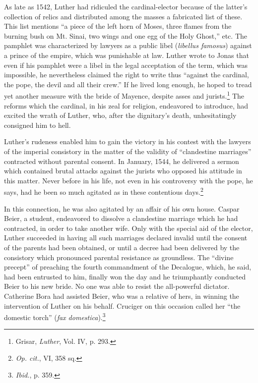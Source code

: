 As late as 1542, Luther had ridiculed the cardinal-elector because
of the latter’s collection of relics and distributed among the masses a
fabricated list of these. This list mentions “a piece of the left horn
of Moses, three flames from the burning bush on Mt. Sinai, two wings
and one egg of the Holy Ghost,” etc. The pamphlet was characterized
by lawyers as a public libel (\textit{libellus famosus}) against a prince of the
empire, which was punishable at law. Luther wrote to Jonas that
even if his pamphlet were a libel in the legal acceptation of the term,
which was impossible, he nevertheless claimed the right to write thus
“against the cardinal, the pope, the devil and all their crew.” If he
lived long enough, he hoped to tread yet another measure with the
bride of Mayence, despite asses and jurists.\footnote{Grisar, \textit{Luther}, Vol. IV, p. 293.}
The reforms which the
cardinal, in his zeal for religion, endeavored to introduce, had excited
the wrath of Luther, who, after the dignitary’s death, unhesitatingly
consigned him to hell.

Luther’s rudeness enabled him to gain the victory in his contest
with the lawyers of the imperial consistory in the matter of the
validity of “clandestine marriages” contracted without parental consent.
In January, 1544, he delivered a sermon which contained brutal
attacks against the jurists who opposed his attitude in this matter.
Never before in his life, not even in his controversy with the pope,
he says, had he been so much agitated as in these contentious days.\footnote{\textit{Op. cit.}, VI, 358 sq.}

In this connection, he was also agitated by an affair of his own house.
Caspar Beier, a student, endeavored to dissolve a clandestine marriage
which he had contracted, in order to take another wife. Only with
the special aid of the elector, Luther succeeded in having all such
marriages declared invalid until the consent of the parents had been
obtained, or until a decree had been delivered by the consistory which
pronounced parental resistance as groundless. The “divine precept”
of preaching the fourth commandment of the Decalogue, which,
he said, had been entrusted to him, finally won the day and he triumphantly
conducted Beier to his new bride. No one was able to
resist the all-powerful dictator. Catherine Bora had assisted Beier, who
was a relative of hers, in winning the intervention of Luther on his
behalf. Cruciger on this occasion called her “the domestic torch”
(\textit{fax domestica}).\footnote{\textit{Ibid.}, p. 359.}
